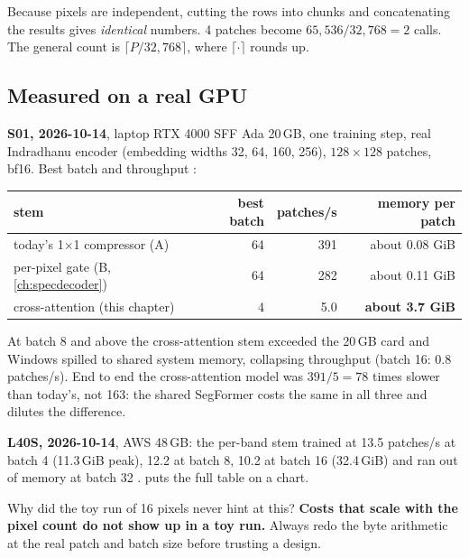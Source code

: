 Because pixels are independent, cutting the rows into chunks and concatenating the results gives \emph{identical} numbers. 4 patches become $65{,}536/32{,}768 = 2$ calls. The general count is $\lceil P/32{,}768\rceil$, where $\lceil\cdot\rceil$ rounds up.

\subsection{Measured on a real GPU}

\begin{drift}
\textbf{S01, 2026-10-14}, laptop RTX 4000 SFF Ada 20\,GB, one training step, real Indradhanu encoder (embedding widths 32, 64, 160, 256), $128\times128$ patches, bf16. Best batch and throughput :
\begin{center}
\begin{tabular}{lrrr}\toprule
stem & best batch & patches/s & memory per patch\\\midrule
today's 1$\times$1 compressor (A) & 64 & 391 & about 0.08 GiB\\
per-pixel gate (B, \cref{ch:specdecoder}) & 64 & 282 & about 0.11 GiB\\
cross-attention (this chapter) & 4 & 5.0 & \textbf{about 3.7 GiB}\\\bottomrule
\end{tabular}
\end{center}
At batch 8 and above the cross-attention stem exceeded the 20\,GB card and Windows spilled to shared system memory, collapsing throughput (batch 16: 0.8 patches/s). End to end the cross-attention model was $391/5 = 78$ times slower than today's, not 163: the shared SegFormer costs the same in all three and dilutes the difference.

\textbf{L40S, 2026-10-14}, AWS 48\,GB: the per-band stem trained at 13.5 patches/s at batch 4 (11.3\,GiB peak), 12.2 at batch 8, 10.2 at batch 16 (32.4\,GiB) and ran out of memory at batch 32 .  puts the full table on a chart.
\end{drift}

Why did the toy run of 16 pixels never hint at this? \textbf{Costs that scale with the pixel count do not show up in a toy run.} Always redo the byte arithmetic at the real patch and batch size before trusting a design.

